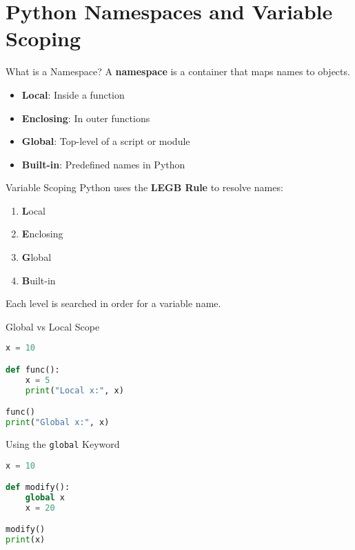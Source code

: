 \section{Python Namespaces and Variable Scoping}
\begin{frame}[plain]
\sectionpage
\end{frame}


\begin{frame}{What is a Namespace?}
A \textbf{namespace} is a container that maps names to objects.
\begin{itemize}
    \item \textbf{Local}: Inside a function
    \item \textbf{Enclosing}: In outer functions
    \item \textbf{Global}: Top-level of a script or module
    \item \textbf{Built-in}: Predefined names in Python
\end{itemize}
\end{frame}

\begin{frame}{Variable Scoping}
Python uses the \textbf{LEGB Rule} to resolve names:
\begin{enumerate}
    \item \textbf{L}ocal
    \item \textbf{E}nclosing
    \item \textbf{G}lobal
    \item \textbf{B}uilt-in
\end{enumerate}

Each level is searched in order for a variable name.
\end{frame}


\begin{frame}[fragile]{Global vs Local Scope}
\begin{lstlisting}[language=Python]
x = 10

def func():
    x = 5
    print("Local x:", x)

func()
print("Global x:", x)
\end{lstlisting}
\end{frame}

\begin{frame}[fragile]{Using the \texttt{global} Keyword}
\begin{lstlisting}[language=Python]
x = 10

def modify():
    global x
    x = 20

modify()
print(x)
\end{lstlisting}
\end{frame}

